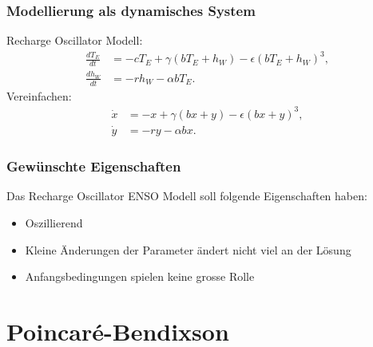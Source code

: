 \documentclass[ngerman, aspectratio=169]{beamer}
\begin{document}
    \begin{frame}
        \frametitle{Modellierung als dynamisches System}
        Recharge Oscillator Modell:
        \begin{align*}
            \frac{dT_E}{dt} &= -cT_E + \gamma \left(bT_E + h_W\right) - \epsilon \left(bT_E + h_W\right)^3, \\
            \frac{dh_W}{dt} &= -rh_W - \alpha b T_E.
        \end{align*}
        \pause
        Vereinfachen:
        \begin{align*}
            \dot{x} &= -x + \gamma \left(bx + y\right) - \epsilon \left(bx + y\right)^3, \\
            \dot{y} &= -ry - \alpha b x.
        \end{align*}
    \end{frame}

    \begin{frame}
    \frametitle{Gewünschte Eigenschaften}
        Das Recharge Oscillator ENSO Modell soll folgende Eigenschaften haben:
        \begin{itemize}
            \item Oszillierend
            \item Kleine Änderungen der Parameter ändert nicht viel an der Lösung
            \item Anfangsbedingungen spielen keine grosse Rolle
        \end{itemize}
    \end{frame}

	\section{Poincaré-Bendixson}
\end{document}
